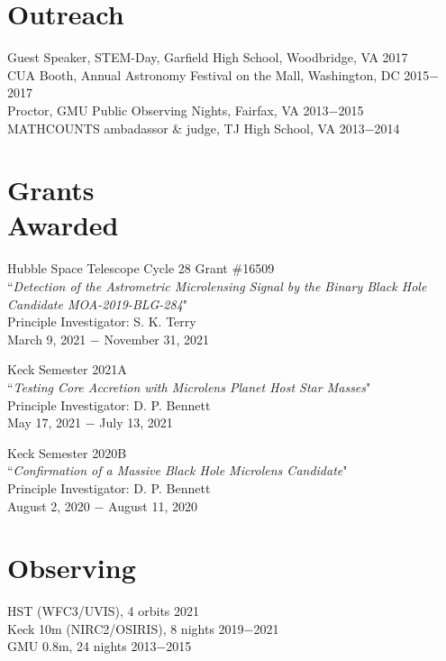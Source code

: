\documentclass[margin,line]{res}
\begin{document}
\begin{resume}
\section{\sc Outreach}
Guest Speaker, STEM-Day, Garfield High School, Woodbridge, VA \hfill 2017 \\
CUA Booth, Annual Astronomy Festival on the Mall, Washington, DC \hfill 2015$-$2017 \\
Proctor, GMU Public Observing Nights, Fairfax, VA \hfill 2013$-$2015 \\
MATHCOUNTS ambadassor \& judge, TJ High School, VA \hfill 2013$-$2014 \\

\section{\sc Grants \\ Awarded}
Hubble Space Telescope Cycle 28 Grant \#16509 \\
``\textit{Detection of the Astrometric Microlensing Signal by the Binary Black Hole Candidate MOA-2019-BLG-284}" \\
Principle Investigator: S. K. Terry \\
March 9, 2021 $-$ November 31, 2021

Keck Semester 2021A \\
``\textit{Testing Core Accretion with Microlens Planet Host Star Masses}" \\
Principle Investigator: D. P. Bennett\\
May 17, 2021 $-$ July 13, 2021

Keck Semester 2020B \\
``\textit{Confirmation of a Massive Black Hole Microlens Candidate}" \\
Principle Investigator: D. P. Bennett\\
August 2, 2020 $-$ August 11, 2020

\section{\sc Observing}
HST (WFC3/UVIS), 4 orbits \hfill 2021\\
Keck 10m (NIRC2/OSIRIS), 8 nights \hfill 2019$-$2021\\
GMU 0.8m, 24 nights \hfill 2013$-$2015 \\


\end{resume}
\end{document}
